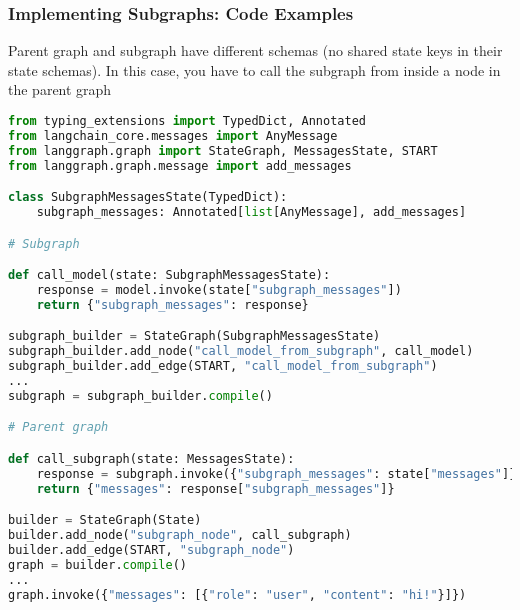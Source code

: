 \begin{frame}[fragile]\frametitle{Implementing Subgraphs: Code Examples}

Parent  graph and subgraph have different schemas (no shared state keys in their state schemas). In this case, you have to call the subgraph from inside a node in the parent graph


\begin{lstlisting}[language=Python, basicstyle=\tiny]
from typing_extensions import TypedDict, Annotated
from langchain_core.messages import AnyMessage
from langgraph.graph import StateGraph, MessagesState, START
from langgraph.graph.message import add_messages

class SubgraphMessagesState(TypedDict):
    subgraph_messages: Annotated[list[AnyMessage], add_messages]

# Subgraph

def call_model(state: SubgraphMessagesState):
    response = model.invoke(state["subgraph_messages"])
    return {"subgraph_messages": response}

subgraph_builder = StateGraph(SubgraphMessagesState)
subgraph_builder.add_node("call_model_from_subgraph", call_model)
subgraph_builder.add_edge(START, "call_model_from_subgraph")
...
subgraph = subgraph_builder.compile()

# Parent graph

def call_subgraph(state: MessagesState):
    response = subgraph.invoke({"subgraph_messages": state["messages"]})
    return {"messages": response["subgraph_messages"]}

builder = StateGraph(State)
builder.add_node("subgraph_node", call_subgraph)
builder.add_edge(START, "subgraph_node")
graph = builder.compile()
...
graph.invoke({"messages": [{"role": "user", "content": "hi!"}]})
      \end{lstlisting}
\end{frame}